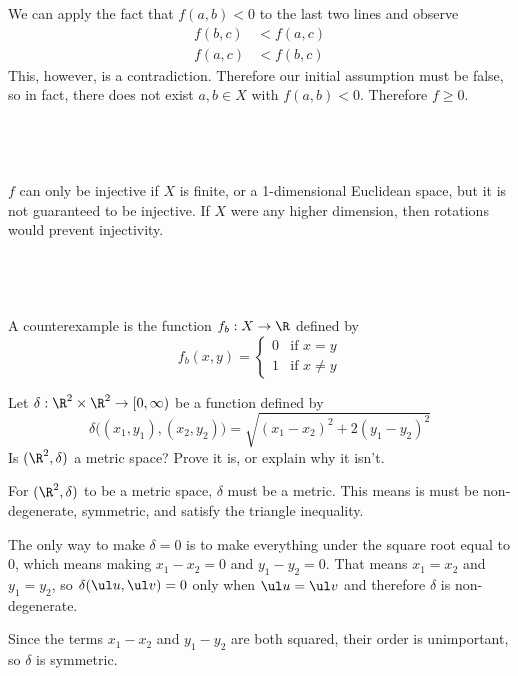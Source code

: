 \documentclass[a4paper]{article}
\begin{document}
We can apply the fact that $f(a, b) < 0$ to the last two lines and observe \begin{align*}
f(b, c) &< f(a, c) \\
f(a, c) &< f(b, c)
\end{align*}
This, however, is a contradiction. Therefore our initial assumption must be false, so in fact, there does not exist $a, b \in X$ with $f(a, b) < 0$. Therefore $f \ge 0$.

\subsection{~} %

$f$ can only be injective if $X$ is finite, or a 1-dimensional Euclidean space, but it is not guaranteed to be injective. If $X$ were any higher dimension, then rotations would prevent injectivity.

\subsection{~} %

A counterexample is the function $f_b : X \to \R$ defined by \[
f_b(x, y) = \begin{cases}
0 & \text{if } x = y \\
1 & \text{if } x \ne y
\end{cases}
\]



\begin{questionbody}
Let $\delta : \R^2 \times \R^2 \to [0, \infty)$ be a function defined by \[ %
\delta\big( (x_1, y_1), (x_2, y_2) \big) = \sqrt{{(x_1 - x_2)}^2 + 2{(y_1 - y_2)}^2}
\] Is $(\R^2, \delta)$ a metric space? Prove it is, or explain why it isn't.
\end{questionbody}

For $(\R^2, \delta)$ to be a metric space, $\delta$ must be a metric. This means is must be non-degenerate, symmetric, and satisfy the triangle inequality.

The only way to make $\delta = 0$ is to make everything under the square root equal to 0, which means making $x_1 - x_2 = 0$ and $y_1 - y_2 = 0$. That means $x_1 = x_2$ and $y_1 = y_2$, so $\delta(\ul u, \ul v) = 0$ only when $\ul u = \ul v$ and therefore $\delta$ is non-degenerate.

Since the terms $x_1 - x_2$ and $y_1 - y_2$ are both squared, their order is unimportant, so $\delta$ is symmetric.
\end{document}
